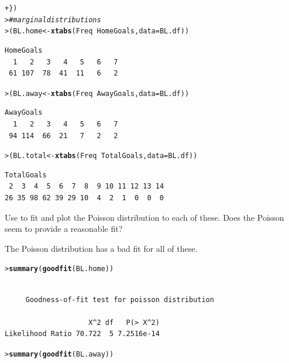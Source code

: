 \documentclass[10pt]{report}\usepackage[]{graphicx}\usepackage[]{color}
\makeatletter
\newcommand{\hlcom}[1]{\textcolor[rgb]{0.678,0.584,0.686}{\textit{#1}}}%
\newcommand{\hlopt}[1]{\textcolor[rgb]{0,0,0}{#1}}%
\newcommand{\hlstd}[1]{\textcolor[rgb]{0.345,0.345,0.345}{#1}}%
\newcommand{\hlkwb}[1]{\textcolor[rgb]{0.69,0.353,0.396}{#1}}%
\newcommand{\hlkwc}[1]{\textcolor[rgb]{0.333,0.667,0.333}{#1}}%
\newcommand{\hlkwd}[1]{\textcolor[rgb]{0.737,0.353,0.396}{\textbf{#1}}}%
\newenvironment{kframe}{%
 \def\at@end@of@kframe{}%
 \ifinner\ifhmode%
  \def\at@end@of@kframe{\end{minipage}}%
  \begin{minipage}{\columnwidth}%
 \fi\fi%
 \def\FrameCommand##1{\hskip\@totalleftmargin \hskip-\fboxsep
 \colorbox{shadecolor}{##1}\hskip-\fboxsep
     \hskip-\linewidth \hskip-\@totalleftmargin \hskip\columnwidth}%
 \MakeFramed {\advance\hsize-\width
   \@totalleftmargin\z@ \linewidth\hsize
   \@setminipage}}%
 {\par\unskip\endMakeFramed%
 \at@end@of@kframe}
\newenvironment{knitrout}{}{} %
\renewenvironment{knitrout}{\small\renewcommand{\baselinestretch}{.85}}{} %
\makeatother
\begin{document}
\begin{Exercises}
\begin{enumerate*}
\begin{ans}
\begin{knitrout}
\begin{kframe}
\begin{alltt}
\hlstd{+ }  \hlstd{\})}
\hlstd{> }   \hlcom{# marginal distributions}
\hlstd{> }\hlstd{(BL.home} \hlkwb{<-} \hlkwd{xtabs}\hlstd{(Freq} \hlopt{~} \hlstd{HomeGoals,} \hlkwc{data}\hlstd{=BL.df))}
\end{alltt}
\begin{verbatim}
HomeGoals
  1   2   3   4   5   6   7 
 61 107  78  41  11   6   2 
\end{verbatim}
\begin{alltt}
\hlstd{> }\hlstd{(BL.away} \hlkwb{<-} \hlkwd{xtabs}\hlstd{(Freq} \hlopt{~} \hlstd{AwayGoals,} \hlkwc{data}\hlstd{=BL.df))}
\end{alltt}
\begin{verbatim}
AwayGoals
  1   2   3   4   5   6   7 
 94 114  66  21   7   2   2 
\end{verbatim}
\begin{alltt}
\hlstd{> }\hlstd{(BL.total} \hlkwb{<-} \hlkwd{xtabs}\hlstd{(Freq} \hlopt{~} \hlstd{TotalGoals,} \hlkwc{data}\hlstd{=BL.df))}
\end{alltt}
\begin{verbatim}
TotalGoals
 2  3  4  5  6  7  8  9 10 11 12 13 14 
26 35 98 62 39 29 10  4  2  1  0  0  0 
\end{verbatim}
\end{kframe}
\end{knitrout}
    \end{ans}
    
    \item Use  to fit and plot the Poisson distribution to each of these.  Does the
    Poisson seem to provide a reasonable fit?
    \begin{ans}
    The Poisson distribution has a bad fit for all of these.
\begin{knitrout}\footnotesize
{}\color{fgcolor}\begin{kframe}
\begin{alltt}
\hlstd{> }\hlkwd{summary}\hlstd{(}\hlkwd{goodfit}\hlstd{(BL.home))}
\end{alltt}
\begin{verbatim}

	 Goodness-of-fit test for poisson distribution

                    X^2 df   P(> X^2)
Likelihood Ratio 70.722  5 7.2516e-14
\end{verbatim}
\begin{alltt}
\hlstd{> }\hlkwd{summary}\hlstd{(}\hlkwd{goodfit}\hlstd{(BL.away))}
\end{alltt}
\begin{verbatim}


\end{verbatim}
\end{kframe}
\end{knitrout}
\end{ans}
\end{enumerate*}
\end{Exercises}
\end{document}
